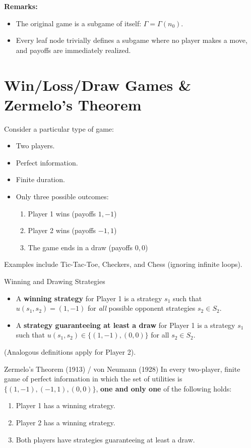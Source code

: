 \documentclass[12pt, a4paper]{article}
\begin{document}
\textbf{Remarks:}
\begin{itemize}
    \item The original game is a subgame of itself: $\Gamma = \Gamma(n_0)$.
    \item Every leaf node trivially defines a subgame where no player makes a move, and payoffs are immediately realized.
\end{itemize}

\section{Win/Loss/Draw Games \& Zermelo's Theorem}

Consider a particular type of game:
\begin{itemize}
    \item Two players.
    \item Perfect information.
    \item Finite duration.
    \item Only three possible outcomes:
    \begin{enumerate}
        \item Player 1 wins (payoffs $1, -1$)
        \item Player 2 wins (payoffs $-1, 1$)
        \item The game ends in a draw (payoffs $0, 0$)
    \end{enumerate}
\end{itemize}
Examples include Tic-Tac-Toe, Checkers, and Chess (ignoring infinite loops).

\begin{defbox}{Winning and Drawing Strategies}
  \begin{itemize}
      \item A \textbf{winning strategy} for Player 1 is a strategy $s_1$ such that $u(s_1, s_2) = (1, -1)$ for \textit{all} possible opponent strategies $s_2 \in S_2$.
      \item A \textbf{strategy guaranteeing at least a draw} for Player 1 is a strategy $s_1$ such that $u(s_1, s_2) \in \{(1,-1), (0,0)\}$ for all $s_2 \in S_2$.
  \end{itemize}
  (Analogous definitions apply for Player 2).
\end{defbox}

\begin{thmbox}{Zermelo's Theorem (1913) / von Neumann (1928)}
  In every two-player, finite game of perfect information in which the set of utilities is $\{(1,-1), (-1,1), (0,0)\}$, \textbf{one and only one} of the following holds:
  \begin{enumerate}
      \item Player 1 has a winning strategy.
      \item Player 2 has a winning strategy.
      \item Both players have strategies guaranteeing at least a draw.
  \end{enumerate}
\end{thmbox}
\end{document}
